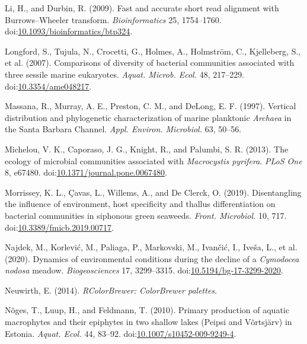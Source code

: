 \documentclass[12pt,]{article}
\begin{document}
\leavevmode\hypertarget{ref-Li2009a}{}%
Li, H., and Durbin, R. (2009). Fast and accurate short read alignment
with Burrows--Wheeler transform. \emph{Bioinformatics} 25, 1754--1760.
doi:\href{https://doi.org/10.1093/bioinformatics/btp324}{10.1093/bioinformatics/btp324}.

\leavevmode\hypertarget{ref-Longford2007}{}%
Longford, S., Tujula, N., Crocetti, G., Holmes, A., Holmström, C.,
Kjelleberg, S., et al. (2007). Comparisons of diversity of bacterial
communities associated with three sessile marine eukaryotes.
\emph{Aquat. Microb. Ecol.} 48, 217--229.
doi:\href{https://doi.org/10.3354/ame048217}{10.3354/ame048217}.

\leavevmode\hypertarget{ref-Massana1997}{}%
Massana, R., Murray, A. E., Preston, C. M., and DeLong, E. F. (1997).
Vertical distribution and phylogenetic characterization of marine
planktonic \emph{Archaea} in the Santa Barbara Channel. \emph{Appl.
Environ. Microbiol.} 63, 50--56.

\leavevmode\hypertarget{ref-Michelou2013}{}%
Michelou, V. K., Caporaso, J. G., Knight, R., and Palumbi, S. R. (2013).
The ecology of microbial communities associated with \emph{Macrocystis
pyrifera}. \emph{PLoS One} 8, e67480.
doi:\href{https://doi.org/10.1371/journal.pone.0067480}{10.1371/journal.pone.0067480}.

\leavevmode\hypertarget{ref-Morrissey2019}{}%
Morrissey, K. L., Çavas, L., Willems, A., and De Clerck, O. (2019).
Disentangling the influence of environment, host specificity and thallus
differentiation on bacterial communities in siphonous green seaweeds.
\emph{Front. Microbiol.} 10, 717.
doi:\href{https://doi.org/10.3389/fmicb.2019.00717}{10.3389/fmicb.2019.00717}.

\leavevmode\hypertarget{ref-Najdek2020}{}%
Najdek, M., Korlević, M., Paliaga, P., Markovski, M., Ivančić, I.,
Iveša, L., et al. (2020). Dynamics of environmental conditions during
the decline of a \emph{Cymodocea nodosa} meadow. \emph{Biogeosciences}
17, 3299--3315.
doi:\href{https://doi.org/10.5194/bg-17-3299-2020}{10.5194/bg-17-3299-2020}.

\leavevmode\hypertarget{ref-Neuwirth2014}{}%
Neuwirth, E. (2014). \emph{RColorBrewer: ColorBrewer palettes}.

\leavevmode\hypertarget{ref-Noges2010}{}%
Nõges, T., Luup, H., and Feldmann, T. (2010). Primary production of
aquatic macrophytes and their epiphytes in two shallow lakes (Peipsi and
Võrtsjärv) in Estonia. \emph{Aquat. Ecol.} 44, 83--92.
doi:\href{https://doi.org/10.1007/s10452-009-9249-4}{10.1007/s10452-009-9249-4}.
\end{document}
